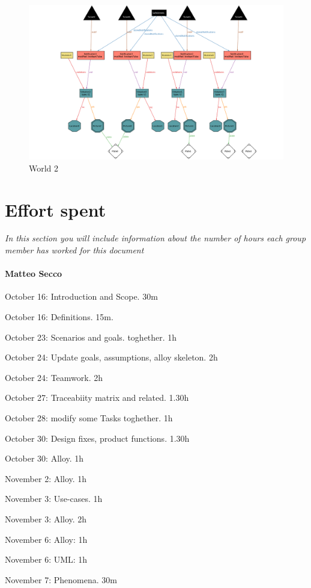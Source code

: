 \documentclass{article}
\begin{document}
	\begin{figure}[H]
		\includegraphics[width=\linewidth]{Images/Alloy_W2_T1}
		\caption{World 2}
		\label{Alloy:W2_T1}
	\end{figure}
	
	
\newpage
\section{Effort spent} \textit{In this section you will include information about the number of hours each group member has worked for this document}

	\paragraph{Matteo Secco} 
		\begin{list}{-}{}
			\item October 16: Introduction and Scope. 30m
			\item October 16: Definitions. 15m.
			\item October 23: Scenarios and goals. toghether. 1h
			\item October 24: Update goals, assumptions, alloy skeleton. 2h
			\item October 24: Teamwork. 2h
			\item October 27: Traceabiity matrix and related. 1.30h
			\item October 28: modify some Tasks toghether. 1h
			\item October 30: Design fixes, product functions. 1.30h
			\item October 30: Alloy. 1h
			\item November 2: Alloy. 1h
			\item November 3: Use-cases. 1h
			\item November 3: Alloy. 2h
			\item November 6: Alloy: 1h
			\item November 6: UML: 1h
			\item November 7: Phenomena. 30m
		\end{list}
		
\end{document}
